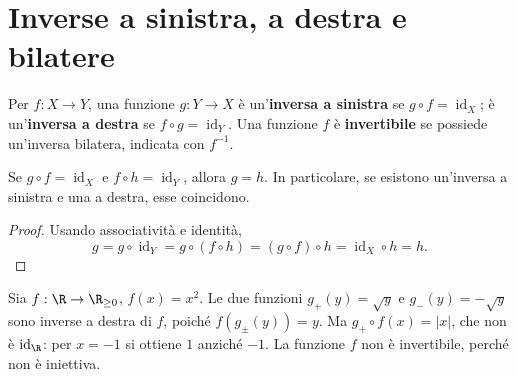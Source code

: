 \section{Inverse a sinistra, a destra e bilatere}
\begin{definizione}
Per $f:X\to Y$, una funzione $g:Y\to X$ è un'\textbf{inversa a sinistra} se $g\circ f=\operatorname{id}_X$; è un'\textbf{inversa a destra} se $f\circ g=\operatorname{id}_Y$. Una funzione $f$ è \textbf{invertibile} se possiede un'inversa bilatera, indicata con $f^{-1}$.
\end{definizione}

\begin{proposizione}
Se $g\circ f=\operatorname{id}_X$ e $f\circ h=\operatorname{id}_Y$, allora $g=h$. In particolare, se esistono un'inversa a sinistra e una a destra, esse coincidono.
\end{proposizione}
\begin{proof}
Usando associatività e identità,
\[
g=g\circ\operatorname{id}_Y=g\circ(f\circ h)
=(g\circ f)\circ h=\operatorname{id}_X\circ h=h.
\]
\end{proof}

\begin{esempio}
Sia $f:\R\to\R_{\ge0}$, $f(x)=x^2$. Le due funzioni $g_+(y)=\sqrt y$ e $g_-(y)=-\sqrt y$ sono inverse a destra di $f$, poiché $f(g_\pm(y))=y$. Ma $g_+\circ f(x)=|x|$, che non è $\operatorname{id}_{\R}$: per $x=-1$ si ottiene $1$ anziché $-1$. La funzione $f$ non è invertibile, perché non è iniettiva.
\end{esempio}

